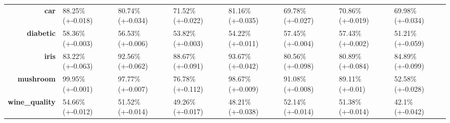 \documentclass[preprint,review,12pt]{elsarticle}
\begin{document}
\begin{table}[!tb]
{\begin{tabular}{r|lllllll}
			\textbf{car}                       & \cellcolor[rgb]{ 1,  .922,  .518}88.25\% (+-0.018)                                                 & \cellcolor[rgb]{ .988,  .714,  .475}80.74\% (+-0.034) & \cellcolor[rgb]{ .973,  .459,  .427}71.52\% (+-0.022) & \cellcolor[rgb]{ .988,  .725,  .478}81.16\% (+-0.035) & \cellcolor[rgb]{ .973,  .412,  .42}69.78\% (+-0.027)  & \cellcolor[rgb]{ .973,  .439,  .424}70.86\% (+-0.019) & \cellcolor[rgb]{ .973,  .416,  .42}69.98\% (+-0.034) \\
			\textbf{diabetic}                  & \cellcolor[rgb]{ .482,  .773,  .49}58.36\% (+-0.003)                                               & \cellcolor[rgb]{ .992,  .847,  .502}56.53\% (+-0.006) & \cellcolor[rgb]{ .98,  .624,  .459}53.82\% (+-0.003)  & \cellcolor[rgb]{ .984,  .655,  .467}54.22\% (+-0.011) & \cellcolor[rgb]{ .992,  .922,  .518}57.45\% (+-0.004) & \cellcolor[rgb]{ 1,  .922,  .518}57.43\% (+-0.002)    & \cellcolor[rgb]{ .973,  .412,  .42}51.21\% (+-0.059) \\
			\textbf{iris}                      & \cellcolor[rgb]{ .976,  .525,  .439}83.22\% (+-0.063)                                              & \cellcolor[rgb]{ .984,  .918,  .518}92.56\% (+-0.062) & \cellcolor[rgb]{ .988,  .757,  .486}88.67\% (+-0.091) & \cellcolor[rgb]{ .816,  .871,  .51}93.67\% (+-0.042)  & \cellcolor[rgb]{ .973,  .412,  .42}80.56\% (+-0.098)  & \cellcolor[rgb]{ .973,  .424,  .42}80.89\% (+-0.084)  & \cellcolor[rgb]{ .98,  .596,  .455}84.89\% (+-0.099) \\
			\textbf{mushroom}                  & \cellcolor[rgb]{ .569,  .796,  .494}99.95\% (+-0.001)                                              & \cellcolor[rgb]{ .996,  .898,  .51}97.77\% (+-0.007)  & \cellcolor[rgb]{ .984,  .671,  .467}76.78\% (+-0.112) & \cellcolor[rgb]{ .996,  .906,  .514}98.67\% (+-0.009) & \cellcolor[rgb]{ .992,  .824,  .498}91.08\% (+-0.008) & \cellcolor[rgb]{ .992,  .804,  .494}89.11\% (+-0.01)  & \cellcolor[rgb]{ .973,  .412,  .42}52.58\% (+-0.028) \\
			\textbf{wine\_quality}             & \cellcolor[rgb]{ .647,  .82,  .498}54.66\% (+-0.012)                                               & \cellcolor[rgb]{ .992,  .835,  .498}51.52\% (+-0.014) & \cellcolor[rgb]{ .988,  .733,  .478}49.26\% (+-0.017) & \cellcolor[rgb]{ .984,  .686,  .471}48.21\% (+-0.038) & \cellcolor[rgb]{ .996,  .867,  .506}52.14\% (+-0.014) & \cellcolor[rgb]{ .992,  .831,  .498}51.38\% (+-0.014) & \cellcolor[rgb]{ .973,  .412,  .42}42.1\% (+-0.042)  \\
		\end{tabular}%
	}
\end{table}%
\end{document}
